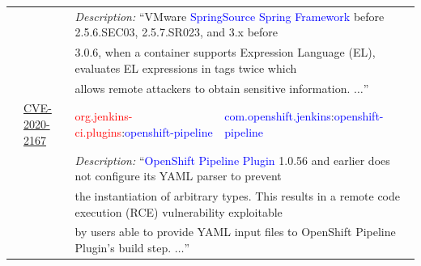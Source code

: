 \begin{table}[t]
\begin{threeparttable}
\begin{tabular}{p{2cm}p{1.8cm}p{4.3cm}p{4.3cm}}
&&  \multicolumn{2}{l}{\textit{Description:} ``VMware \textcolor{Blue}{SpringSource Spring Framework} before 2.5.6.SEC03, 2.5.7.SR023, and 3.x before  }                                                                                                                                                                                \\
&& \multicolumn{2}{l}{ 3.0.6, when a container supports Expression Language (EL), evaluates EL expressions in tags twice which } \\
& & \multicolumn{2}{l}{allows remote attackers to obtain sensitive information. $\dots$''}                                                                                                                                                                                \\
\cmidrule(lr){3-4}
  & \href{https://github.com/advisories/GHSA-264w-xrr7-6qqg}{CVE-2020-2167}                       & \textcolor{Red}{org.jenkins-ci.plugins}:\textcolor{Blue}{openshift-pipeline}                    & \textcolor{Blue}{com.openshift.jenkins}:\textcolor{Blue}{openshift-pipeline}                       \\
&&\multicolumn{2}{l}{\textit{Description:} ``\textcolor{Blue}{OpenShift Pipeline Plugin} 1.0.56 and earlier does not configure its YAML parser to prevent} \\
&&\multicolumn{2}{l}{
the instantiation of arbitrary types. This results in a remote code execution (RCE) vulnerability exploitable}                                                                                                                                                                      \\
&& \multicolumn{2}{l}{  by users able to provide YAML input files to OpenShift Pipeline Plugin’s build step. $\dots$''}                                                                                                                                                                      \\
\midrule

\end{tabular}
\end{threeparttable}
\end{table}
